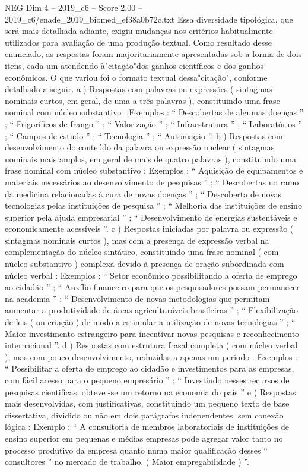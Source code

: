 \begin{textsample}{NEG Dim 4 – 2019\_c6 – Score 2.00 – 2019\_c6/enade\_2019\_biomed\_ef38a0b72c.txt}
Essa diversidade tipológica, que será mais detalhada adiante, exigiu mudanças nos critérios habitualmente utilizados para avaliação de uma produção textual.
Como resultado desse enunciado, as respostas foram majoritariamente apresentadas sob a forma de dois itens, cada um atendendo à"citação"dos ganhos científicos e dos ganhos econômicos.
O que variou foi o formato textual dessa"citação", conforme detalhado a seguir. a ) Respostas com palavras ou expressões ( sintagmas nominais curtos, em geral, de uma a três palavras ), constituindo uma frase nominal com núcleo substantivo : Exemplos : “ Descobertas de algumas doenças ” ; “ Frigoríficos de frango ” ; “ Valorização ” ; “ Infraestrutura ” ; “ Laboratórios ” ; “ Campos de estudo ” ; “ Tecnologia ” ; “ Automação ”. b ) Respostas com desenvolvimento do conteúdo da palavra ou expressão nuclear ( sintagmas nominais mais amplos, em geral de mais de quatro palavras ), constituindo uma frase nominal com núcleo substantivo : Exemplos : “ Aquisição de equipamentos e materiais necessários ao desenvolvimento de pesquisas ” ; “ Descobertas no ramo da medicina relacionadas à cura de novas doenças ” ; “ Descoberta de novas tecnologias pelas instituições de pesquisa ” ; “ Melhoria das instituições de ensino superior pela ajuda empresarial ” ; “ Desenvolvimento de energias sustentáveis e economicamente acessíveis ”. c ) Respostas iniciadas por palavra ou expressão ( sintagmas nominais curtos ), mas com a presença de expressão verbal na complementação do núcleo sintático, constituindo uma frase nominal ( com núcleo substantivo ) complexa devido à presença de oração subordinada com núcleo verbal : Exemplos : “ Setor econômico possibilitando a oferta de emprego ao cidadão ” ; “ Auxílio financeiro para que os pesquisadores possam permanecer na academia ” ; “ Desenvolvimento de novas metodologias que permitam aumentar a produtividade de áreas agriculturáveis brasileiras ” ; “ Flexibilização de leis ( ou criação ) de modo a estimular a utilização de novas tecnologias ” ; “ Maior investimento estrangeiro para incentivar novas pesquisas e reconhecimento internacional ”. d ) Respostas com estrutura frasal completa ( com núcleo verbal ), mas com pouco desenvolvimento, reduzidas a apenas um período : Exemplos : “ Possibilitar a oferta de emprego ao cidadão e investimentos para as empresas, com fácil acesso para o pequeno empresário ” ; “ Investindo nesses recursos de pesquisas cientificas, obteve -se um retorno na economia do país ” e ) Respostas mais desenvolvidas, com justificativas, constituindo um pequeno texto de base dissertativa, dividido ou não em dois parágrafos independentes, sem conexão lógica : Exemplo : “ A consultoria de membros laboratoriais de instituições de ensino superior em pequenas e médias empresas pode agregar valor tanto no processo produtivo da empresa quanto numa maior qualificação desses “ consultores ” no mercado de trabalho. ( Maior empregabilidade ) ”.

\end{textsample}
